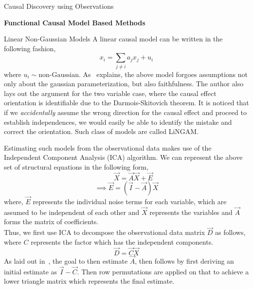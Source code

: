 \documentclass[10pt]{article}
\begin{document}
\begin{psection}[3]{Causal Discovery using Observations}
\begin{psubsection}{\textbf{Functional Causal Model Based Methods}}
        \begin{pssubsection}{Linear Non-Gaussian Models}
            A linear causal model can be written in the following fashion,
            \begin{equation}
                x_i = \sum_{j \neq i} a_j x_j + u_i
            \end{equation}
            where $u_i \sim \text{non-Gaussian}$. As~\cite{eberhardt2017introduction}
            explains, the above model forgoes assumptions not only about the gaussian
            parameterization, but also faithfulness. The author also lays out the
            argument for the two variable case, where the causal effect orientation is
            identifiable due to the Darmois-Skitovich theorem. It is noticed that if we
            \textit{accidentally} assume the wrong direction for the causal effect and
            proceed to establish independences, we would easily be able to identify the
            mistake and correct the orientation. Such class of models are called
            LiNGAM.%
            
            Estimating such models from the observational data makes use of the
            Independent Component Analysis (ICA) algorithm. We can represent the above
            set of structural equations in the following form,
            \begin{equation}
                \quad \quad \vec{X} = \vec{A}\vec{X} + \vec{E}
            \end{equation}
            \begin{equation}
                \implies \vec{E} = (\vec{I} - \vec{A})\vec{X}
            \end{equation}
            where, $\vec{E}$ represents the individual noise terms for each variable,
            which are assumed to be independent of each other and $\vec{X}$ represents
            the variables and $\vec{A}$ forms the matrix of coefficients.  \\
            Thus, we first use ICA to decompose the observational data matrix $\vec{D}$
            as follows, where $C$ represents the factor which has the independent
            components. 
            \begin{equation}
                \vec{D} = \vec{C}\vec{X}
            \end{equation}
            As laid out in~\cite{guo2018survey}, the goal to then estimate $\vec{A}$,
            then follows by first deriving an initial estimate as $\vec{I} - \vec{C}$.
            Then row permutations are applied on that to achieve a lower triangle matrix
            which represents the final estimate. 
        

\end{pssubsection}
\end{psubsection}
\end{psection}
\end{document}
